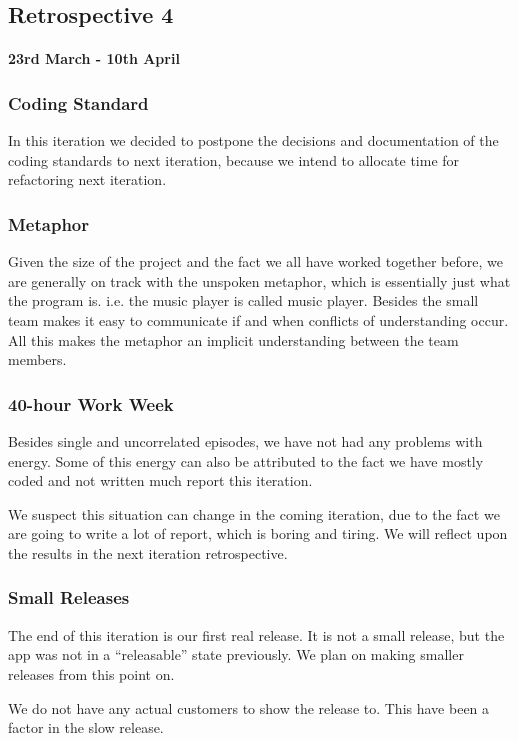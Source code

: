 \subsection*{Retrospective 4}
\paragraph{23rd March - 10th April}

\subsubsection{Coding Standard}
In this iteration we decided to postpone the decisions and documentation of the coding standards to next iteration, because we intend to allocate time for refactoring next iteration. 

\subsubsection{Metaphor}
Given the size of the project and the fact we all have worked together before, we are generally on track with the unspoken metaphor, which is essentially just what the program is. i.e. the music player is called music player.
Besides the small team makes it easy to communicate if and when conflicts of understanding occur.
All this makes the metaphor an implicit understanding between the team members.
\subsubsection{40-hour Work Week}
Besides single and uncorrelated episodes, we have not had any problems with energy.
Some of this energy can also be attributed to the fact we have mostly coded and not written much report this iteration. 

We suspect this situation can change in the coming iteration, due to the fact we are going to write a lot of report, which is boring and tiring. We will reflect upon the results in the next iteration retrospective.

\subsubsection{Small Releases}
The end of this iteration is our first real release. It is not a small release, but the app was not in a “releasable” state previously. We plan on making smaller releases from this point on.

We do not have any actual customers to show the release to. This have been a factor in the slow release.

